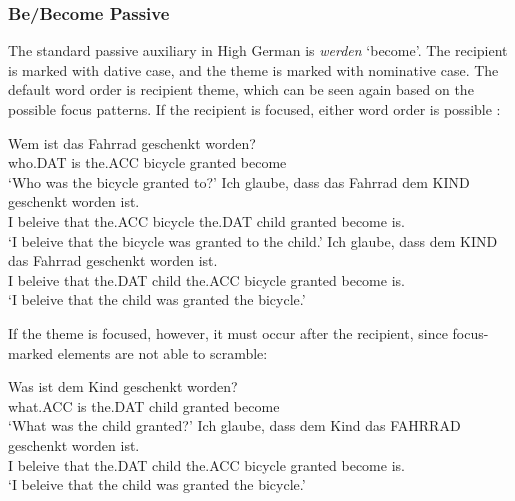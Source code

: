 \subsubsection{Be/Become Passive}
The standard passive auxiliary in High German is \emph{werden} `become'. The recipient is marked with dative case, and the theme is marked with nominative case. The default word order is recipient theme, which can be seen again based on the possible focus patterns. If the recipient is focused, either word order is possible \citep{Lenerz.1977}:
\begin{exe}
\ex
\begin{xlist}
\ex \gll Wem ist das Fahrrad geschenkt worden?\\
who.DAT is the.ACC bicycle granted become\\
\trans `Who was the bicycle granted to?'
\ex \gll Ich glaube, dass das Fahrrad dem KIND geschenkt worden ist.\\
I beleive that the.ACC bicycle the.DAT child granted become is.\\
\trans `I beleive that the bicycle was granted to the child.'
\ex \gll Ich glaube, dass dem KIND das Fahrrad geschenkt worden ist.\\
I beleive that the.DAT child the.ACC bicycle granted become is.\\
\trans `I beleive that the child was granted the bicycle.'
\end{xlist}
\end{exe}
If the theme is focused, however, it must occur after the recipient, since focus-marked elements are not able to scramble:
\begin{exe}
\ex
\begin{xlist}
\ex \gll Was ist dem Kind geschenkt worden?\\
what.ACC is the.DAT child granted become\\
\trans `What was the child granted?'
\ex \gll Ich glaube, dass dem Kind das FAHRRAD geschenkt worden ist.\\
I beleive that the.DAT child the.ACC bicycle granted become is.\\
\trans `I beleive that the child was granted the bicycle.'
\end{xlist}
\end{exe}
